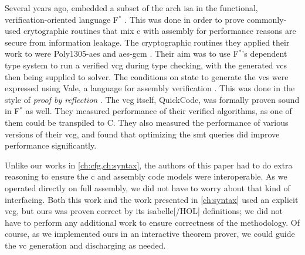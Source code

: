 Several years ago, \textcite{fromherz2019verified} embedded a subset
of the \gls{arch} \gls{isa} in the functional, verification-oriented language
F$^*$ \autocite{fstar}.
This was done in order to prove commonly-used crytographic routines
that mix \gls{c} with assembly for performance reasons are secure from information leakage.
The cryptographic routines they applied their work to were
Poly1305-\gls{aes} \autocite{bernstein2005poly1305} and
\gls{aes}-\gls{gcm} \autocite{dworkin2007recommendation}.
Their aim was to use F$^*$'s dependent type system to run a verified \gls{vcg}
during type checking, with the generated \glspl{vc}
then being supplied to  solver.
The conditions on state to generate the \glspl{vc} were expressed using Vale,
a language for assembly verification \autocite{bond2017vale}.
This was done in the style of \emph{proof by reflection} \autocite{bertot2004reflection}.
The \gls{vcg} itself, QuickCode, was formally proven sound in F$^*$ as well.
They measured performance of their verified algorithms, as one of them could be
transpiled to C. They also measured the performance of various versions
of their \gls{vcg}, and found that optimizing the \gls{smt} queries did improve performance
significantly.

Unlike our works in \cref{ch:cfg,ch:syntax}, the authors of this paper
had to do extra reasoning to ensure the \gls{c} and assembly code models were interoperable.
As we operated directly on full assembly, we did not have to worry about
that kind of interfacing. Both this work and the work presented in \cref{ch:syntax} used an explicit \gls{vcg},
but ours was proven correct by its \gls{isabelle}[/HOL] definitions;
we did not have to perform any additional work to ensure correctness
of the methodology.
Of course, as we implemented ours in an interactive theorem prover,
we could guide the \gls{vc} generation and discharging as needed.

